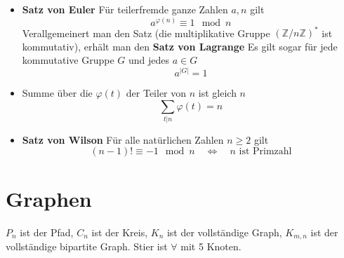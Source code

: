 \documentclass[landscape, 8pt, a4paper]{extarticle}
\newcommand{\Z}{\mathbb{Z}}
\begin{document}
\begin{multicols}{3}
\begin{itemize}
		\item \textbf{Satz von Euler} Für teilerfremde ganze Zahlen $a,n$ gilt
		\begin{equation*}
			a^{\varphi(n)}\equiv 1 \mod n
		\end{equation*}
		Verallgemeinert man den Satz (die multiplikative Gruppe $(\Z/n\Z)^\ast$ ist kommutativ), erhält man den \textbf{Satz von Lagrange} Es gilt sogar für jede kommutative Gruppe $G$ und jedes $a\in G$ 
		\begin{equation*}
		 	a^{|G|}=1
		\end{equation*} 

		\item Summe über die $\varphi(t)$ der Teiler von $n$ ist gleich $n$
		\begin{equation*}
			\sum_{t|n}\varphi(t)=n
		\end{equation*}

		\item \textbf{Satz von Wilson} Für alle natürlichen Zahlen $n\geq 2$ gilt
		\begin{equation*}
			(n-1)!\equiv -1\mod n\quad\Leftrightarrow\quad n \text{ ist Primzahl}
		\end{equation*}
	\end{itemize}


	\section{Graphen}
	$P_n$ ist der Pfad, $C_n$ ist der Kreis, $K_n$ ist der vollständige Graph, $K_{m,n}$ ist der vollständige bipartite Graph. Stier ist $\forall$ mit 5 Knoten.


\end{multicols}
\end{document}
